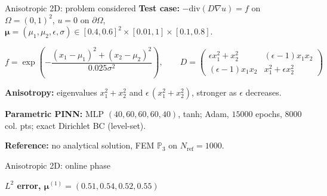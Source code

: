 \begin{frame}{Anisotropic 2D: problem considered}
	\setlength{\plotwidth}{0.38\textwidth}\setlength{\plotheight}{0.27\textwidth}
	\textbf{Test case:} $-\text{div}(D\nabla u)=f$ on $\Omega=(0,1)^2$, $u=0$ on $\partial\Omega$, $\bm{\mu}=(\mu_1,\mu_2,\epsilon,\sigma)\in[0.4,0.6]^2\times[0.01,1]\times[0.1,0.8]$.

	\vspace{-4pt}
	\[
		f=\exp\left(-\frac{(x_1-\mu_1)^2+(x_2-\mu_2)^2}{0.025\sigma^2}\right), \qquad
		D=\begin{pmatrix}
			\epsilon x_1^2+x_2^2 & (\epsilon-1)x_1x_2 \\
			(\epsilon-1)x_1x_2   & x_1^2+\epsilon x_2^2
		\end{pmatrix}
	\]

	\vspace{-2pt}
	\textbf{Anisotropy:} eigenvalues $x_1^2+x_2^2$ and $\epsilon\,(x_1^2+x_2^2)$, stronger as $\epsilon$ decreases.

	\vspace{6pt}
	\textbf{Parametric PINN:} MLP $(40,60,60,60,40)$, tanh; Adam, $15000$ epochs, $8000$ col. pts; exact Dirichlet BC (level-set).

	\vspace{6pt}
	\textbf{Reference:} no analytical solution, FEM $\mathbb{P}_3$ on $N_\text{ref}=1000$.
\end{frame}

\begin{frame}{Anisotropic 2D: online phase}
	\setlength{\plotwidth}{0.38\textwidth}\setlength{\plotheight}{0.27\textwidth}
	\begin{minipage}[t]{0.50\linewidth}
		\vspace{0pt}
		{\centering
			\textbf{$L^2$ error, $\bm{\mu}^{(1)}=(0.51,0.54,0.52,0.55)$}

			\vspace{-2pt}
			}
	\end{minipage} \hfill \begin{minipage}[t]{0.46\linewidth}
		\vspace{0pt}
	\end{minipage}

	\vspace{4pt}
\end{frame}

